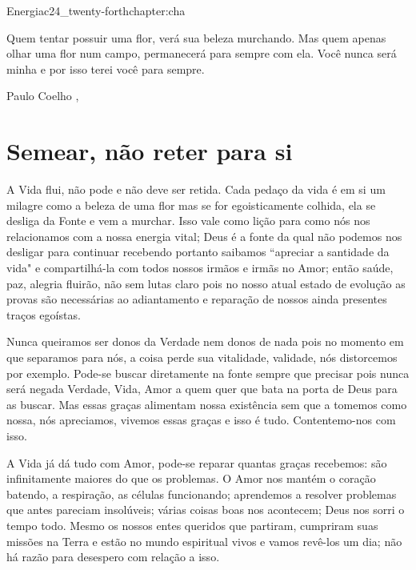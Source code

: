 \begin{chapterpage}{Energia}{c24_twenty-forthchapter:cha}

\begin{myquotation}Quem tentar possuir uma flor, verá sua beleza murchando. Mas quem apenas olhar uma flor num campo, permanecerá para sempre com ela. Você nunca será minha e por isso terei você para sempre.

\par\vspace*{15mm}
\mbox{}\hfill \emdash{}Paulo Coelho 
, %
\par\end{myquotation}

\end{chapterpage}



\section{Semear, não reter para si}\label{c1_basicformatting:sec}

\emdash{}A Vida flui, não pode e não deve ser retida. Cada pedaço da vida é em si um milagre como a beleza de uma flor mas se for egoisticamente colhida, ela se desliga da Fonte e vem a murchar. Isso vale como lição para como nós nos relacionamos com  a nossa energia vital; Deus é a fonte da qual não podemos nos desligar para continuar recebendo portanto saibamos ``apreciar a santidade da vida" e compartilhá-la com todos nossos irmãos e irmãs no Amor; então saúde, paz, alegria fluirão, não sem lutas claro pois no nosso atual estado de evolução as provas são necessárias ao adiantamento e reparação de nossos ainda presentes traços egoístas. 

\emdash{}Nunca queiramos ser donos da Verdade nem donos de nada pois no momento em que separamos para nós, a coisa perde sua vitalidade, validade, nós distorcemos por exemplo. Pode-se buscar diretamente na fonte sempre que precisar pois nunca será negada Verdade, Vida, Amor a quem quer que bata na porta de Deus para as buscar. Mas essas graças alimentam nossa existência sem que a tomemos como nossa, nós apreciamos, vivemos essas graças e isso é tudo. Contentemo-nos com isso.

\emdash{}A Vida já dá tudo com Amor, pode-se reparar quantas graças recebemos: são infinitamente maiores do que os problemas. O Amor nos mantém o coração batendo, a respiração, as células funcionando; aprendemos a resolver problemas que antes pareciam insolúveis; várias coisas boas nos acontecem; Deus nos sorri o tempo todo. Mesmo os nossos entes queridos que partiram, cumpriram suas missões na Terra e estão no mundo espiritual vivos e vamos revê-los um dia; não há razão para desespero com relação a isso.

